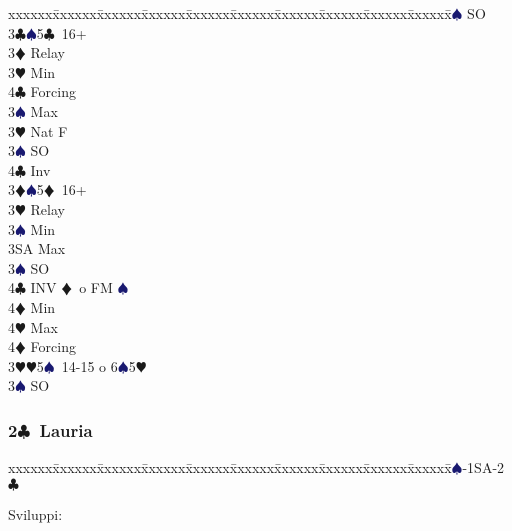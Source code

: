 \documentclass[a4paper,italian]{article}
\newcommand{\BC}{\textcolor{OliveGreen}{$\clubsuit$}}
\newcommand{\BD}{\textcolor{RedOrange}{$\vardiamondsuit$}}
\newcommand{\BH}{\textcolor{Red2}{$\varheartsuit${}}}
\newcommand{\BS}{\textcolor{MidnightBlue}{$\spadesuit${}}}
\newcommand{\pdfc}{\texorpdfstring{\BC{}}{C}}
\newenvironment{bidtable}
{\begin{tabbing}

    xxxxxx\=xxxxxx\=xxxxxx\=xxxxxx\=xxxxxx\=xxxxxx\=xxxxxx\=xxxxxx\=xxxxxx\=xxxxxx\=\kill}
{\end{tabbing} }%
\begin{document}
\begin{multicols}{2}
\begin{bidtable}
        3\BS \> SO\-\\
        3\BC {}\BS 5\BC\ 16+\+\\
        3\BD \> Relay\+\\
        3\BH \> Min\+\\
        4\BC \> Forcing\-\\
        3\BS \> Max\-\\
        3\BH \> Nat F\\
        3\BS \> SO\\
        4\BC \> Inv\-\\
        3\BD {}\BS 5\BD\ 16+\+\\
        3\BH \> Relay\+\\
        3\BS \> Min\\
        3SA \> Max\-\\
        3\BS \> SO\\
        4\BC \> INV \BD\ o FM \BS \+\\
        4\BD \> Min\\
        4\BH \> Max\-\\
        4\BD \> Forcing\-\\
        3\BH {}\BH 5\BS\ 14-15 o 6\BS 5\BH \+\\
        3\BS \> SO\-\-
    \end{bidtable}

    \subsubsection{2\pdfc\ Lauria}

    \begin{bidtable}
        1\BS-1SA-2\BC
    \end{bidtable}

    Sviluppi:


\end{multicols}
\end{document}
